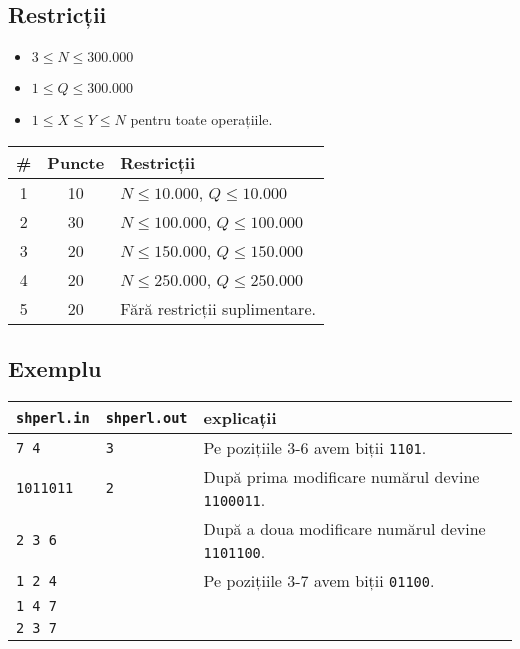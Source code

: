 \documentclass{article}
\begin{document}
\subsection*{Restricții}

\begin{itemize}
\item $3 \leq N \leq 300.000$
\item $1 \leq Q \leq 300.000$
\item $1 \leq X \leq Y \leq N$ pentru toate operațiile.
\end{itemize}

\begin{table}[H]
\setlength{\tabcolsep}{30pt}
\begin{tabular}{ccl} \toprule
    \textbf{\#} & \textbf{Puncte} & \textbf{Restricții} \\ \midrule
    1  & 10 & $N \leq 10.000$, $Q \leq 10.000$ \\
    2  & 30 & $N \leq 100.000$, $Q \leq 100.000$ \\
    3  & 20 & $N \leq 150.000$, $Q \leq 150.000$ \\
    4  & 20 & $N \leq 250.000$, $Q \leq 250.000$ \\
    5  & 20 & Fără restricții suplimentare. \\ \bottomrule
\end{tabular}
\end{table}

\subsection*{Exemplu}

\begin{table}[H]
  \setlength{\tabcolsep}{25pt}
  \begin{tabular}{l l l} \toprule
    \texttt{shperl.in} & \texttt{shperl.out} & explicații      \\ \midrule
    \texttt{7 4}       & \texttt{3}          & Pe pozițiile 3-6 avem biții \texttt{1101}. \\
    \texttt{1011011}   & \texttt{2}          & După prima modificare numărul devine \texttt{1100011}. \\
    \texttt{2 3 6}     &                     & După a doua modificare numărul devine \texttt{1101100}. \\
    \texttt{1 2 4}     &                     & Pe pozițiile 3-7 avem biții \texttt{01100}. \\
    \texttt{1 4 7}     &                     & \\
    \texttt{2 3 7}     &                     & \\
    \bottomrule
  \end{tabular}
\end{table}
\end{document}
